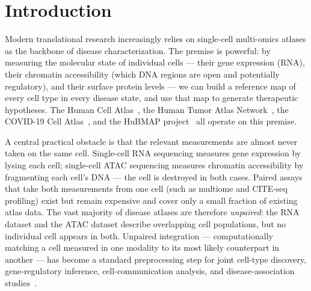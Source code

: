 \documentclass[pmlr]{jmlr}
\begin{document}
\section{Introduction}
\label{sec:intro}

Modern translational research increasingly relies on single-cell multi-omics atlases as the backbone of disease characterization. The premise is powerful: by measuring the molecular state of individual cells --- their gene expression (RNA), their chromatin accessibility (which DNA regions are open and potentially regulatory), and their surface protein levels --- we can build a reference map of every cell type in every disease state, and use that map to generate therapeutic hypotheses. The Human Cell Atlas~\citep{regev2017hca}, the Human Tumor Atlas Network~\citep{rozenblatt2020htan}, the COVID-19 Cell Atlas~\citep{stephenson2021single}, and the HuBMAP project~\citep{hubmap2019} all operate on this premise.

A central practical obstacle is that the relevant measurements are almost never taken on the same cell. Single-cell RNA sequencing measures gene expression by lysing each cell; single-cell ATAC sequencing measures chromatin accessibility by fragmenting each cell's DNA --- the cell is destroyed in both cases. Paired assays that take both measurements from one cell (such as multiome and CITE-seq profiling) exist but remain expensive and cover only a small fraction of existing atlas data. The vast majority of disease atlases are therefore \emph{unpaired}: the RNA dataset and the ATAC dataset describe overlapping cell populations, but no individual cell appears in both. Unpaired integration --- computationally matching a cell measured in one modality to its most likely counterpart in another --- has become a standard preprocessing step for joint cell-type discovery, gene-regulatory inference, cell-communication analysis, and disease-association studies~\citep{demetci2022scot,cao2022multi,cao2022uniport,hao2024seurat5}.
\end{document}
